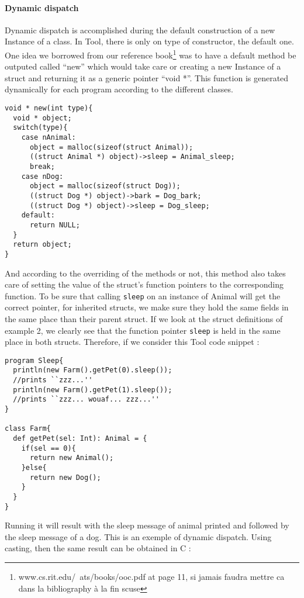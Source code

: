 \paragraph{Dynamic dispatch}
Dynamic dispatch is accomplished during the default construction of a new Instance of a class.
In Tool, there is only on type of constructor, the default one.
One idea we borrowed from our reference book\footnote{www.cs.rit.edu/~ats/books/ooc.pdf at page 11, si jamais faudra mettre ca dans la bibliography à la fin scuse} was to have a default method be outputed called ``new'' which would take care or creating a new Instance of a struct and returning it as a generic pointer ``void *''. This function is generated dynamically for each program according to the different classes.
\begin{lstlisting}
void * new(int type){
  void * object;
  switch(type){
    case nAnimal:
      object = malloc(sizeof(struct Animal));
      ((struct Animal *) object)->sleep = Animal_sleep;
      break;
    case nDog:
      object = malloc(sizeof(struct Dog));
      ((struct Dog *) object)->bark = Dog_bark;
      ((struct Dog *) object)->sleep = Dog_sleep;
    default:
      return NULL;
  }
  return object;
}
\end{lstlisting}
And according to the overriding of the methods or not, this method also takes care of setting the value of the struct's function pointers to the corresponding function. To be sure that calling {\lstinline[basicstyle=\small\ttfamily]|sleep|} on an instance of Animal will get the correct pointer, for inherited structs, we make sure they hold the same fields in the same place than their parent struct. If we look at the struct definitions of example 2, we clearly see that the function pointer {\lstinline[basicstyle=\small\ttfamily]|sleep|} is held in the same place in both structs. Therefore, if we consider this Tool code snippet :

\lstset{style=customtool}
\begin{lstlisting}
program Sleep{
  println(new Farm().getPet(0).sleep());
  //prints ``zzz...''
  println(new Farm().getPet(1).sleep());
  //prints ``zzz... wouaf... zzz...''
}

class Farm{
  def getPet(sel: Int): Animal = {
    if(sel == 0){
      return new Animal();
    }else{
      return new Dog();
    }
  }
}
\end{lstlisting}
Running it will result with the sleep message of animal printed and followed by the sleep message of a dog. This is an exemple of dynamic dispatch. Using casting, then the same result can be obtained in C :

